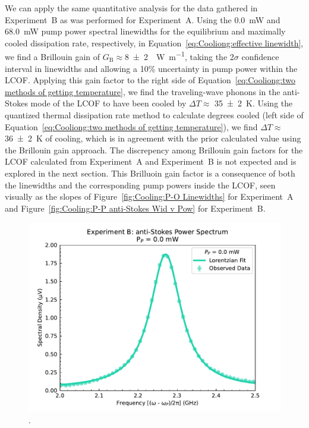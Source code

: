 We can apply the same quantitative analysis for the data gathered in Experiment~B as was performed for Experiment~A. Using the \SI{0.0}{\milli\watt} and \SI{68.0}{\milli\watt} pump power spectral linewidths for the equilibrium and maximally cooled dissipation rate, respectively, in Equation~\ref{eq:Cooliong:effective linewidth}, we find a Brillouin gain of \(G_{\mathrm{B}} \approx \)\SI{8(2)}{\per\watt\per\meter}, taking the 2\(\sigma\) confidence interval in linewidths and allowing a 10\% uncertainty in pump power within the \ac{LCOF}. Applying this gain factor to the right side of Equation~\ref{eq:Cooliong:two methods of getting temperature}, we find the traveling-wave phonons in the anti-Stokes mode of the \ac{LCOF} to have been cooled by \(\Delta T\approx\) \SI{35(2)}{\kelvin}. Using the quantized thermal dissipation rate method to calculate degrees cooled (left side of Equation~\ref{eq:Cooliong:two methods of getting temperature}), we find \(\Delta T \approx\)\SI{36(2)}{\kelvin} of cooling, which is in agreement with the prior calculated value using the Brillouin gain approach. The discrepency among Brillouin gain factors for the \ac{LCOF} calculated from Experiment~A and Experiment~B is not expected and is explored in the next section. This Brilluoin gain factor is a consequence of both the linewidths and the corresponding pump powers inside the \ac{LCOF}, seen visually as the slopes of Figure~\ref{fig:Cooling:P-O Linewidths} for Experiment~A and Figure~\ref{fig:Cooling:P-P anti-Stokes Wid v Pow} for Experiment~B.

\begin{figure}[t!]
  \centering
  \includegraphics[width=\textwidth]{figs/3-Cooling/P-P anti-Stokes Fit - 0mW.pdf}
  \caption{.}
  \label{fig:Cooling:P-P anti-Stokes Fit - 0mW}
\end{figure}

